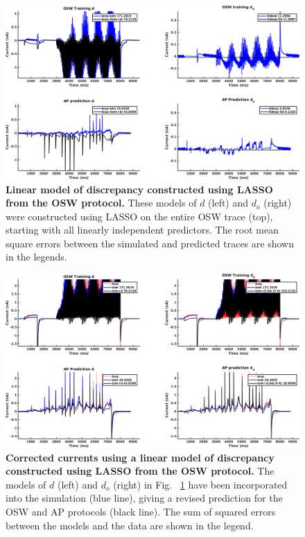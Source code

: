 \documentclass[11pt,a4paper,oneside]{article}
\begin{document}
\clearpage

\begin{figure}[t]
\begin{center}
\includegraphics[scale=0.42]{Figures/LASSO_OSW_AP_full_discrepancy.png}
\caption{\textbf{Linear model of discrepancy constructed using LASSO from the OSW protocol.} These models of $d$ (left) and $d_o$ (right) were constructed using LASSO on the entire OSW trace (top), starting with all linearly independent predictors. The root mean square errors between the simulated and predicted traces are shown in the legends. } 
\label{Fig_LASSO_OSW_AP_full_discrepancy}
\end{center}
\end{figure}

\begin{figure}[hb]
\begin{center}
\includegraphics[scale=0.42]{Figures/LASSO_OSW_AP_full_currents.png}
\caption{\textbf{Corrected currents using a linear model of discrepancy constructed using LASSO from the OSW protocol.} The models of $d$ (left) and $d_o$ (right) in Fig. ~\ref{Fig_LASSO_OSW_AP_full_discrepancy} have been incorporated into the simulation (blue line), giving a revised prediction for the OSW and AP protocols (black line). The sum of squared errors between the models and the data are shown in the legend.}
\label{Fig_LASSO_OSW_AP_full_currents}
\end{center}
\end{figure}
\end{document}
